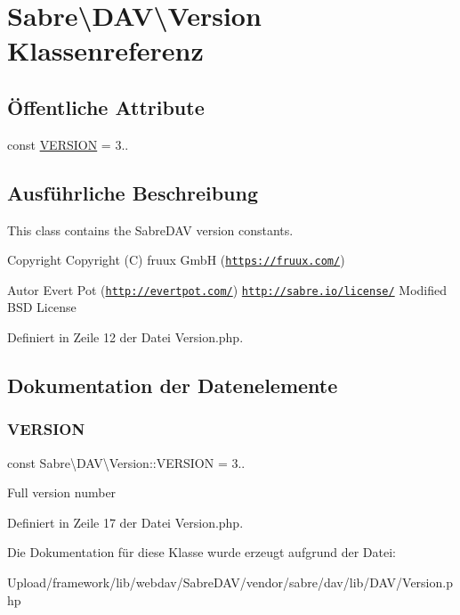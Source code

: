 \hypertarget{class_sabre_1_1_d_a_v_1_1_version}{}\section{Sabre\textbackslash{}D\+AV\textbackslash{}Version Klassenreferenz}
\label{class_sabre_1_1_d_a_v_1_1_version}
\subsection*{Öffentliche Attribute}
\begin{DoxyCompactItemize}
\item 
const \mbox{\hyperlink{class_sabre_1_1_d_a_v_1_1_version_aaf6f7a6c2a5568fe373de83ee5018838}{V\+E\+R\+S\+I\+ON}} = \textquotesingle{}3..\textquotesingle{}
\end{DoxyCompactItemize}


\subsection{Ausführliche Beschreibung}
This class contains the Sabre\+D\+AV version constants.

\begin{DoxyCopyright}{Copyright}
Copyright (C) fruux GmbH (\href{https://fruux.com/}{\tt https\+://fruux.\+com/}) 
\end{DoxyCopyright}
\begin{DoxyAuthor}{Autor}
Evert Pot (\href{http://evertpot.com/}{\tt http\+://evertpot.\+com/})  \href{http://sabre.io/license/}{\tt http\+://sabre.\+io/license/} Modified B\+SD License 
\end{DoxyAuthor}


Definiert in Zeile 12 der Datei Version.\+php.



\subsection{Dokumentation der Datenelemente}
\mbox{\label{class_sabre_1_1_d_a_v_1_1_version_aaf6f7a6c2a5568fe373de83ee5018838}} 
\subsubsection{\texorpdfstring{V\+E\+R\+S\+I\+ON}{VERSION}}
{\footnotesize\ttfamily const Sabre\textbackslash{}\+D\+A\+V\textbackslash{}\+Version\+::\+V\+E\+R\+S\+I\+ON = \textquotesingle{}3..\textquotesingle{}}

Full version number 

Definiert in Zeile 17 der Datei Version.\+php.



Die Dokumentation für diese Klasse wurde erzeugt aufgrund der Datei\+:\begin{DoxyCompactItemize}
\item 
Upload/framework/lib/webdav/\+Sabre\+D\+A\+V/vendor/sabre/dav/lib/\+D\+A\+V/Version.\+php\end{DoxyCompactItemize}
